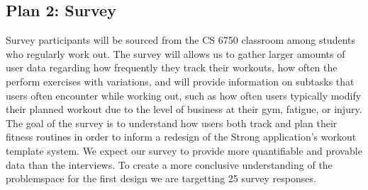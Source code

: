 \documentclass[
	letterpaper, %
]{jdf}
\begin{document}
\subsection{Plan 2: Survey}
Survey participants will be sourced from the CS 6750 classroom among students who regularly work out. The survey will allows us to gather larger amounts of user data regarding how frequently they track their workouts, how often the perform exercises with variations, and will provide information on subtasks that users often encounter while working out, such as how often users typically modify their planned workout due to the level of business at their gym, fatigue, or injury. The goal of the survey is to understand how users both track and plan their fitness routines in order to inform a redesign of the Strong application's workout template system.
We expect our survey to provide more quantifiable and provable data than the interviews. To create a more conclusive understanding of the problemspace for the first design we are targetting 25 survey responses.
\end{document}
